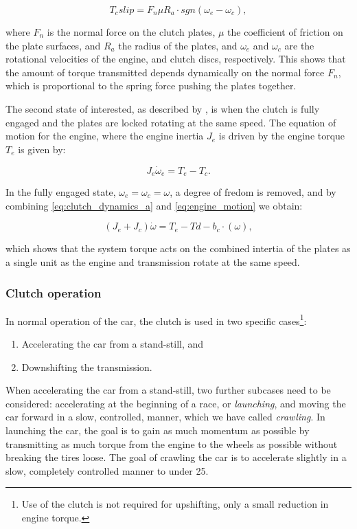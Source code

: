 \begin{equation}\label{eq:clutch_slip}
  T_c{slip}=F_n\mu R_a \cdot sgn\left(\omega_e-\omega_c\right),
\end{equation}

where $F_n$ is the normal force on the clutch plates, $\mu$ the coefficient of friction on the plate surfaces, and $R_a$ the radius of the plates, and $\omega_e$ and $\omega_c$ are the rotational velocities of the engine, and clutch discs, respectively. This shows that the amount of torque transmitted depends dynamically on the normal force $F_n$, which is proportional to the spring force pushing the plates together.

The second state of interested, as described by \cite{clutch_control}, is when the clutch is fully engaged and the plates are locked rotating at the same speed. The equation of motion for the engine, where the engine inertia $J_e$ is driven by the engine torque $T_e$ is given by:

\begin{equation}\label{eq:engine_motion}
  J_e\dot{\omega}_e=T_e-T_c.
\end{equation}

In the fully engaged state, $\omega_e=\omega_c=\omega$, a degree of fredom is removed, and by combining \eqref{eq:clutch_dynamics_a} and \eqref{eq:engine_motion} we obtain:

\begin{equation}
  \left(J_e+J_c\right)\dot{\omega}=T_e-Td-b_c\cdot\left(\omega\right),
\end{equation}

which shows that the system torque acts on the combined intertia of the plates as a single unit as the engine and transmission rotate at the same speed.

\subsubsection{Clutch operation}

In normal operation of the car, the clutch is used in two specific cases\footnote{Use of the clutch is not required for upshifting, only a small reduction in engine torque.}:
\begin{enumerate}
  \item Accelerating the car from a stand-still, and
  \item Downshifting the transmission.
\end{enumerate}

When accelerating the car from a stand-still, two further subcases need to be considered: accelerating at the beginning of a race, or \emph{launching}, and moving the car forward in a slow, controlled, manner, which we have called \emph{crawling}. In launching the car, the goal is to gain as much momentum as possible by transmitting as much torque from the engine to the wheels as possible without breaking the tires loose. The goal of crawling the car is to accelerate slightly in a slow, completely controlled manner to under \unit{25}{\kilo\metre\per\hour}.

